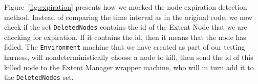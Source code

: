 Figure~\ref{fig:expiration} presents how we mocked the node expiration detection method. Instead of comparing the time interval as in the original code, we now check if the set \texttt{DeletedNodes} contains the id of the Extent Node that we are checking for expiration. If it contains the id, then it means that the node has failed. The \texttt{Environment} machine that we have created as part of our testing \psharp harness, will nondeterministically choose a node to kill, then send the id of this killed node to the Extent Manager wrapper machine, who will in turn add it to the \texttt{DeletedNodes} set.
